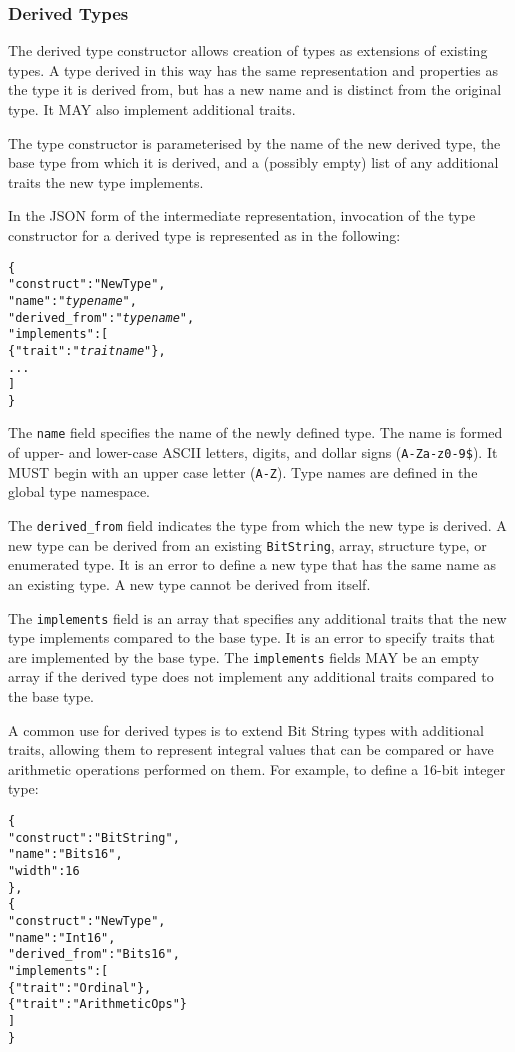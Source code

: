 \documentclass[10pt,twocolumn,a4paper]{article}
\newcommand{\code}[1]{\texttt{#1}}
\begin{document}
\subsubsection{Derived Types}

The derived type constructor allows creation of types as extensions of
existing types. A type derived in this way has the same representation
and properties as the type it is derived from, but has a new name and is
distinct from the original type. It MAY also implement additional traits.

The type constructor is parameterised by the name of the new derived type,
the base type from which it is derived, and a (possibly empty) list of any
additional traits the new type implements.

In the JSON form of the intermediate representation, invocation of the
type constructor for a derived type is represented as in the following:
\footnotesize
\begin{alltt}
  \{
    "construct"     : "NewType",
    "name"          : "\emph{type name}",
    "derived\_from"  : "\emph{type name}",
    "implements"    : [
      \{"trait" : "\emph{trait name}"\},
      ...
    ]
  \}
\end{alltt}
\normalsize
The \code{name} field specifies the name of the newly defined type. The
name is formed of upper- and lower-case ASCII letters, digits, and dollar
signs (\code{A-Za-z0-9\$}).  It MUST begin with an upper case letter
(\code{A-Z}). Type names are defined in the global type namespace.

The \code{derived\_from} field indicates the type from which the new type is
derived.  A new type can be derived from an existing \code{BitString},
array, structure type, or enumerated type. It is an error to define a new
type that has the same name as an existing type. A new type cannot be
derived from itself.

The \code{implements} field is an array that specifies any additional
traits that the new type implements compared to the base type. It is an
error to specify traits that are implemented by the base type.
The \code{implements} fields MAY be an empty array if the derived type
does not implement any additional traits compared to the base type.

A common use for derived types is to extend Bit String types with additional
traits, allowing them to represent integral values that can be compared or
have arithmetic operations performed on them. For example, to define a 16-bit
integer type:
\footnotesize
\begin{alltt}
  \{
    "construct"     : "BitString",
    "name"          : "Bits16",
    "width"         : 16
  \},
  \{
    "construct"     : "NewType",
    "name"          : "Int16",
    "derived\_from"  : "Bits16",
    "implements"    : [
      \{"trait" : "Ordinal"\},
      \{"trait" : "ArithmeticOps"\}
    ]
  \}
\end{alltt}
\normalsize
\end{document}
